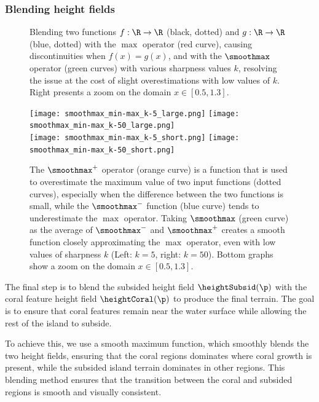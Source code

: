 \subsubsection{Blending height fields}
\label{subsubsec:height-functions-blending}

\begin{figure}[H]
    \caption{Blending two functions $f: \R \to \R$ (black, dotted) and $g: \R \to \R$ (blue, dotted) with the $\max$ operator (red curve), causing discontinuities when $f(x)=g(x)$, and with the $\smoothmax$ operator (green curves) with various sharpness values $k$, resolving the issue at the cost of slight overestimations with low values of $k$. Right presents a zoom on the domain $x \in [0.5, 1.3]$. }
    \label{fig:coral-island-blend-function-island}
\end{figure}

\begin{figure}[H]
    \texttt{[image: smoothmax\_min-max\_k-5\_large.png]}
    \texttt{[image: smoothmax\_min-max\_k-50\_large.png]} \\
    \texttt{[image: smoothmax\_min-max\_k-5\_short.png]}
    \texttt{[image: smoothmax\_min-max\_k-50\_short.png]}
    \caption{The $\smoothmax^+$ operator (orange curve) is a function that is used to overestimate the maximum value of two input functions (dotted curves), especially when the difference between the two functions is small, while the $\smoothmax^-$ function (blue curve) tends to underestimate the $\max$ operator. Taking $\smoothmax$ (green curve) as the average of $\smoothmax^-$ and $\smoothmax^+$ creates a smooth function closely approximating the $\max$ operator, even with low values of sharpness $k$ (Left: $k=5$, right: $k=50$). Bottom graphs show a zoom on the domain $x \in [0.5, 1.3]$.}
    \label{fig:coral-island-blend-function-island-with-upper}
\end{figure}

The final step is to blend the subsided height field $\heightSubsid(\p)$ with the coral feature height field $\heightCoral(\p)$ to produce the final terrain. The goal is to ensure that coral features remain near the water surface while allowing the rest of the island to subside.

To achieve this, we use a smooth maximum function, which smoothly blends the two height fields, ensuring that the coral regions dominates where coral growth is present, while the subsided island terrain dominates in other regions. This blending method ensures that the transition between the coral and subsided regions is smooth and visually consistent.

